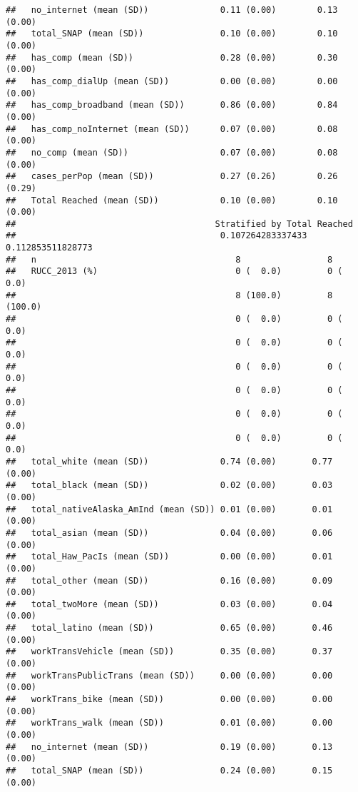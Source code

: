 \documentclass[
]{article}
\begin{document}
\begin{verbatim}
##   no_internet (mean (SD))              0.11 (0.00)        0.13 (0.00)       
##   total_SNAP (mean (SD))               0.10 (0.00)        0.10 (0.00)       
##   has_comp (mean (SD))                 0.28 (0.00)        0.30 (0.00)       
##   has_comp_dialUp (mean (SD))          0.00 (0.00)        0.00 (0.00)       
##   has_comp_broadband (mean (SD))       0.86 (0.00)        0.84 (0.00)       
##   has_comp_noInternet (mean (SD))      0.07 (0.00)        0.08 (0.00)       
##   no_comp (mean (SD))                  0.07 (0.00)        0.08 (0.00)       
##   cases_perPop (mean (SD))             0.27 (0.26)        0.26 (0.29)       
##   Total Reached (mean (SD))            0.10 (0.00)        0.10 (0.00)       
##                                       Stratified by Total Reached
##                                        0.107264283337433 0.112853511828773
##   n                                       8                 8             
##   RUCC_2013 (%)                           0 (  0.0)         0 (  0.0)     
##                                           8 (100.0)         8 (100.0)     
##                                           0 (  0.0)         0 (  0.0)     
##                                           0 (  0.0)         0 (  0.0)     
##                                           0 (  0.0)         0 (  0.0)     
##                                           0 (  0.0)         0 (  0.0)     
##                                           0 (  0.0)         0 (  0.0)     
##                                           0 (  0.0)         0 (  0.0)     
##   total_white (mean (SD))              0.74 (0.00)       0.77 (0.00)      
##   total_black (mean (SD))              0.02 (0.00)       0.03 (0.00)      
##   total_nativeAlaska_AmInd (mean (SD)) 0.01 (0.00)       0.01 (0.00)      
##   total_asian (mean (SD))              0.04 (0.00)       0.06 (0.00)      
##   total_Haw_PacIs (mean (SD))          0.00 (0.00)       0.01 (0.00)      
##   total_other (mean (SD))              0.16 (0.00)       0.09 (0.00)      
##   total_twoMore (mean (SD))            0.03 (0.00)       0.04 (0.00)      
##   total_latino (mean (SD))             0.65 (0.00)       0.46 (0.00)      
##   workTransVehicle (mean (SD))         0.35 (0.00)       0.37 (0.00)      
##   workTransPublicTrans (mean (SD))     0.00 (0.00)       0.00 (0.00)      
##   workTrans_bike (mean (SD))           0.00 (0.00)       0.00 (0.00)      
##   workTrans_walk (mean (SD))           0.01 (0.00)       0.00 (0.00)      
##   no_internet (mean (SD))              0.19 (0.00)       0.13 (0.00)      
##   total_SNAP (mean (SD))               0.24 (0.00)       0.15 (0.00)      

\end{verbatim}
\end{document}
